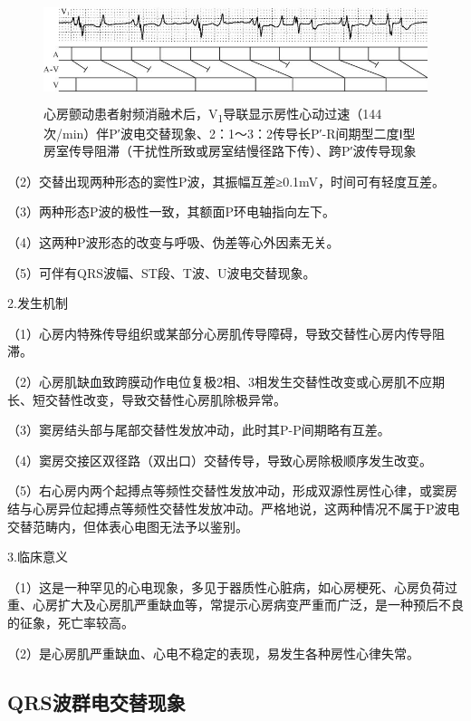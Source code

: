 \begin{figure}[!htbp]
 \centering
 \includegraphics[width=5.33333in,height=1.17708in]{./images/Image00651.jpg}
 \captionsetup{justification=centering}
 \caption{心房颤动患者射频消融术后，V\textsubscript{1}导联显示房性心动过速（144次/min）伴P′波电交替现象、2：1～3：2传导长P′-R间期型二度Ⅰ型房室传导阻滞（干扰性所致或房室结慢径路下传）、跨P′波传导现象}
 \label{fig39-2}
  \end{figure} 


（2）交替出现两种形态的窦性P波，其振幅互差≥0.1mV，时间可有轻度互差。

（3）两种形态P波的极性一致，其额面P环电轴指向左下。

（4）这两种P波形态的改变与呼吸、伪差等心外因素无关。

（5）可伴有QRS波幅、ST段、T波、U波电交替现象。

2.发生机制

（1）心房内特殊传导组织或某部分心房肌传导障碍，导致交替性心房内传导阻滞。

（2）心房肌缺血致跨膜动作电位复极2相、3相发生交替性改变或心房肌不应期长、短交替性改变，导致交替性心房肌除极异常。

（3）窦房结头部与尾部交替性发放冲动，此时其P-P间期略有互差。

（4）窦房交接区双径路（双出口）交替传导，导致心房除极顺序发生改变。

（5）右心房内两个起搏点等频性交替性发放冲动，形成双源性房性心律，或窦房结与心房异位起搏点等频性交替性发放冲动。严格地说，这两种情况不属于P波电交替范畴内，但体表心电图无法予以鉴别。

3.临床意义

（1）这是一种罕见的心电现象，多见于器质性心脏病，如心房梗死、心房负荷过重、心房扩大及心房肌严重缺血等，常提示心房病变严重而广泛，是一种预后不良的征象，死亡率较高。

（2）是心房肌严重缺血、心电不稳定的表现，易发生各种房性心律失常。

\protect\hypertarget{text00046.htmlux5cux23subid512}{}{}

\subsection{QRS波群电交替现象}

